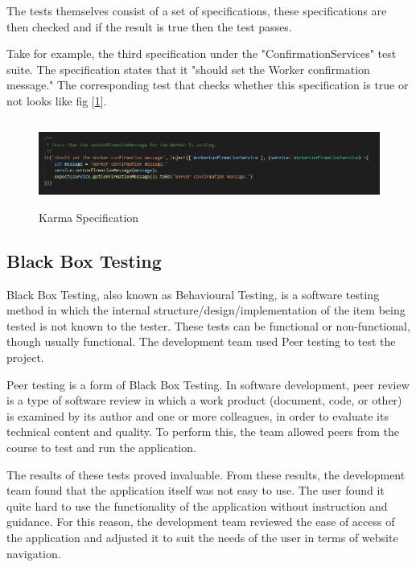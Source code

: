 \bigskip
The tests themselves consist of a set of specifications, these specifications are then checked and if the result is true then the test passes.

\bigskip

Take for example, the third specification under the "ConfirmationServices" test suite. The specification states that
it "should set the Worker confirmation message." The corresponding test that checks whether this specification is true or not looks like fig [\ref{fig:spec}]. 

\bigskip

\begin{figure}[H]
    \centering
    \includegraphics[width=\textwidth, height=80pt]{TestCase.PNG}
    \caption{Karma Specification}
    \label{fig:spec}
\end{figure}


\subsection{Black Box Testing}
\label{sec:MethodologyBlackBox}
Black Box Testing, also known as Behavioural Testing, is a software testing method in which the internal structure/design/implementation of the item being tested is not known to the tester. These tests can be functional or non-functional, though usually functional. The development team used Peer testing to test the project.

Peer testing\cite{clark2004peer} is a form of Black Box Testing. In software development, peer review is a type of software review in which a work product (document, code, or other) is examined by its author and one or more colleagues, in order to evaluate its technical content and quality. To perform this, the team allowed peers from the course to test and run the application.

The results of these tests proved invaluable. From these results, the development team found that the application itself was not easy to use. The user found it quite hard to use the functionality of the application without instruction and guidance. For this reason, the development team reviewed the ease of access of the application and adjusted it to suit the needs of the user in terms of website navigation.



